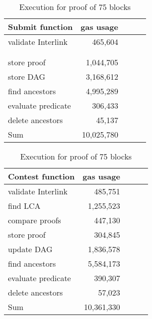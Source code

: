 \begin{table}[H]
    \centering
    \begin{tabular}{@{}lccll@{}}
        \toprule
        \multicolumn{1}{c}{\textbf{Submit function}} & \textbf{gas usage}    \\ \midrule
        validate Interlink  & \multicolumn{1}{r}{   465,604} \\
        \\
        \\
        store proof         & \multicolumn{1}{r}{ 1,044,705} \\
        store DAG           & \multicolumn{1}{r}{ 3,168,612} \\
        find ancestors     & \multicolumn{1}{r}{ 4,995,289} \\
        evaluate predicate  & \multicolumn{1}{r}{   306,433} \\
        delete ancestors    & \multicolumn{1}{r}{    45,137} \\
        \midrule
        Sum                 & \multicolumn{1}{r}{10,025,780} \\
        \bottomrule
    \end{tabular}
    \quad
    \begin{tabular}{@{}lccll@{}}
        \toprule
        \multicolumn{1}{c}{\textbf{Contest function}} & \textbf{gas usage} \\ \midrule
        validate Interlink  & \multicolumn{1}{r}{   485,751} \\
        find LCA            & \multicolumn{1}{r}{ 1,255,523} \\
        compare proofs      & \multicolumn{1}{r}{   447,130} \\
        store proof         & \multicolumn{1}{r}{   304,845} \\
        update DAG          & \multicolumn{1}{r}{ 1,836,578} \\
        find ancestors     & \multicolumn{1}{r}{ 5,584,173} \\
        evaluate predicate  & \multicolumn{1}{r}{   390,307} \\
        delete ancestors    & \multicolumn{1}{r}{    57,023} \\
        \midrule
        Sum                 & \multicolumn{1}{r}{10,361,330} \\
        \bottomrule
    \end{tabular}
    \caption{Execution for proof of 75 blocks}
    \label{table:old_gas_usage}
\end{table}
